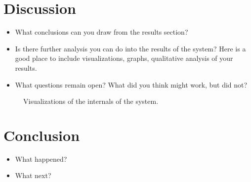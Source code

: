 \documentclass{article}
\begin{document}



\section{Discussion}



\begin{itemize}
\item What conclusions can you draw from the results section?
\item Is there further analysis you can do into the results of the system? Here is a good place to include visualizations, graphs, qualitative analysis of your results.

\item  What questions remain open? What did you think might work, but did not?
\end{itemize}



\begin{figure}
  \centering
  \missingfigure{}
  \missingfigure{}
  \missingfigure{}
  \caption{Visualizations of the internals of the system.}
\end{figure}

\section{Conclusion}

\begin{itemize}
\item What happened?
\item What next?
\end{itemize}









\end{document}
